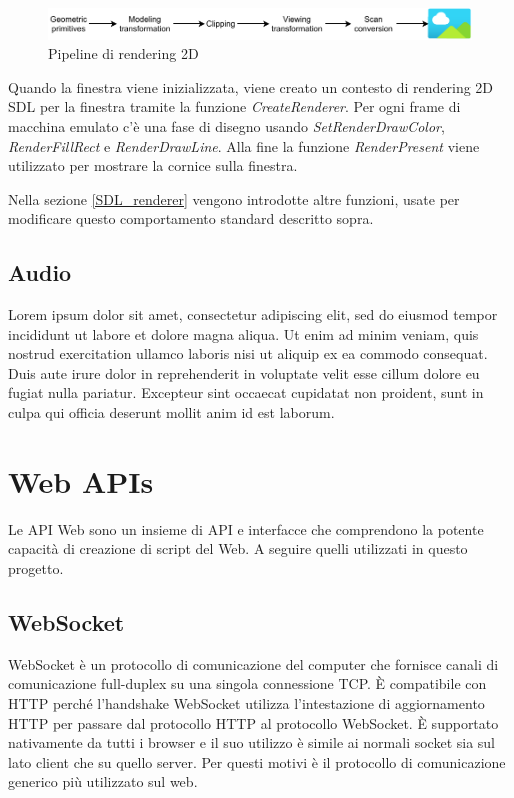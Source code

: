 \begin{figure}[H]
	\includegraphics[width=\linewidth]{immagini/rendering_pipeline}
	\caption{Pipeline di rendering 2D}
	\label{fig:rendering_pipeline}
\end{figure}

Quando la finestra viene inizializzata, viene creato un contesto di rendering 2D SDL per la finestra tramite la funzione \textit{CreateRenderer}. Per ogni frame di macchina emulato c'è una fase di disegno usando \textit{SetRenderDrawColor}, \textit{RenderFillRect} e \textit{RenderDrawLine}. Alla fine la funzione \textit{RenderPresent} viene utilizzato per mostrare la cornice sulla finestra.

Nella sezione \ref{SDL_renderer} vengono introdotte altre funzioni, usate per modificare questo comportamento standard descritto sopra.


\subsection{Audio}
Lorem ipsum dolor sit amet, consectetur adipiscing elit, sed do eiusmod tempor incididunt ut labore et dolore magna aliqua. Ut enim ad minim veniam, quis nostrud exercitation ullamco laboris nisi ut aliquip ex ea commodo consequat. Duis aute irure dolor in reprehenderit in voluptate velit esse cillum dolore eu fugiat nulla pariatur. Excepteur sint occaecat cupidatat non proident, sunt in culpa qui officia deserunt mollit anim id est laborum.



\section{Web APIs}
Le API Web sono un insieme di API e interfacce che comprendono la potente capacità di creazione di script del Web. A seguire quelli utilizzati in questo progetto\cite{Web_APIs}.

\subsection{WebSocket}
WebSocket è un protocollo di comunicazione del computer che fornisce canali di comunicazione full-duplex su una singola connessione TCP. È compatibile con HTTP perché l'handshake WebSocket utilizza l'intestazione di aggiornamento HTTP per passare dal protocollo HTTP al protocollo WebSocket. È supportato nativamente da tutti i browser e il suo utilizzo è simile ai normali socket sia sul lato client che su quello server. Per questi motivi è il protocollo di comunicazione generico più utilizzato sul web\cite{WebSocket_Web_APIs}.

